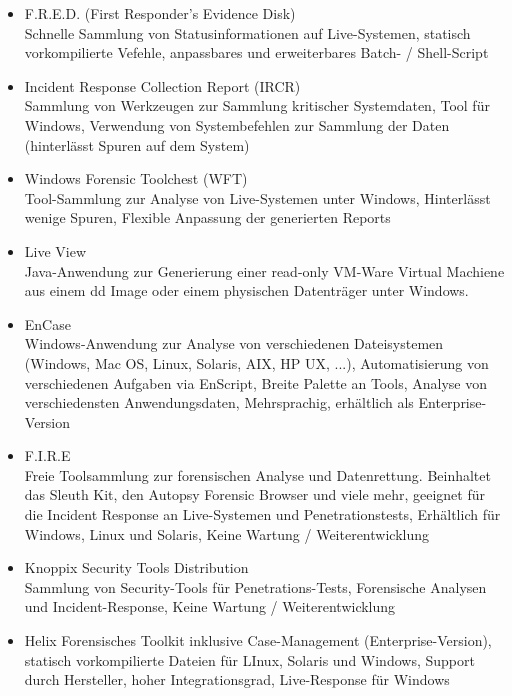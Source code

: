\begin{itemize}
\item F.R.E.D. (First Responder's Evidence Disk)\\
Schnelle Sammlung von Statusinformationen auf Live-Systemen, statisch vorkompilierte Vefehle, anpassbares und erweiterbares Batch- / Shell-Script

\item Incident Response Collection Report (IRCR)\\
Sammlung von Werkzeugen zur Sammlung kritischer Systemdaten, Tool für Windows, Verwendung von Systembefehlen zur Sammlung der Daten (hinterlässt Spuren auf dem System)

\item Windows Forensic Toolchest (WFT)\\
Tool-Sammlung zur Analyse von Live-Systemen unter Windows, Hinterlässt wenige Spuren, Flexible Anpassung der generierten Reports

\item Live View\\
Java-Anwendung zur Generierung einer read-only VM-Ware Virtual Machiene aus einem dd Image oder einem physischen Datenträger unter Windows.

\item EnCase \\
Windows-Anwendung zur Analyse von verschiedenen Dateisystemen (Windows, Mac OS, Linux, Solaris, AIX, HP UX, ...), Automatisierung von verschiedenen Aufgaben via EnScript, Breite Palette an Tools, Analyse von verschiedensten Anwendungsdaten, Mehrsprachig, erhältlich als Enterprise-Version

\item F.I.R.E\\
Freie Toolsammlung zur forensischen Analyse und Datenrettung. Beinhaltet das Sleuth Kit, den Autopsy Forensic Browser und viele mehr, geeignet für die Incident Response an Live-Systemen und Penetrationstests, Erhältlich für Windows, Linux und Solaris, Keine Wartung / Weiterentwicklung

\item Knoppix Security Tools Distribution\\
Sammlung von Security-Tools für Penetrations-Tests, Forensische Analysen und Incident-Response, Keine Wartung / Weiterentwicklung

\item Helix
Forensisches Toolkit inklusive Case-Management (Enterprise-Version), statisch vorkompilierte Dateien für LInux, Solaris und Windows, Support durch Hersteller, hoher Integrationsgrad, Live-Response für Windows



\end{itemize}
